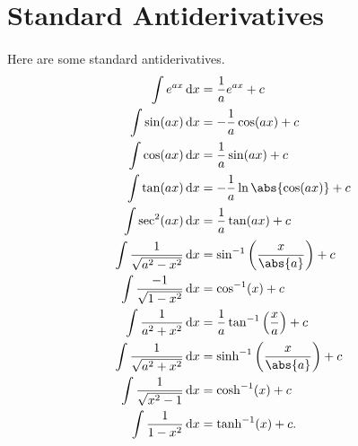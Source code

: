 \documentclass[../multivariate_calculus.tex]{subfiles}
\begin{document}


    \section{Standard Antiderivatives}
        \paragraph{}
        Here are some standard antiderivatives.
        \begin{align}
            \int e^{ax}\dd{x}&=\frac{1}{a}e^{ax}+c\\
            \int\sin(ax)\dd{x}&=-\frac{1}{a}\cos(ax)+c\\
            \int\cos(ax)\dd{x}&=\frac{1}{a}\sin(ax)+c\\
            \int\tan(ax)\dd{x}&=-\frac{1}{a}\ln\abs{\cos(ax)}+c\\
            \int\sec^2(ax)\dd{x}&=\frac{1}{a}\tan(ax)+c\\
            \int\frac{1}{\sqrt{a^2-x^2}}\dd{x}&=\sin^{-1}\left(\frac{x}{\abs{a}}\right)+c \\
            \int\frac{-1}{\sqrt{1-x^2}}\dd{x}&=\cos^{-1}(x)+c \\
            \int\frac{1}{a^2+x^2}\dd{x}&=\frac{1}{a}\tan^{-1}\left(\frac{x}{a}\right)+c \\
            \int\frac{1}{\sqrt{a^2+x^2}}\dd{x}&=\sinh^{-1}\left(\frac{x}{\abs{a}}\right)+c \\
            \int\frac{1}{\sqrt{x^2-1}}\dd{x}&=\cosh^{-1}(x)+c \\
            \int\frac{1}{1-x^2}\dd{x}&=\tanh^{-1}(x)+c.
        \end{align}
\end{document}
